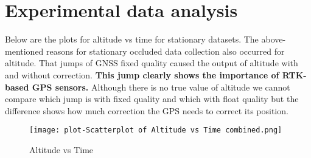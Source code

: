\documentclass[a4paper]{article}
\begin{document}
\section{Experimental data analysis}
Below are the plots for altitude vs time for stationary datasets. The above-mentioned reasons for stationary occluded data collection also occurred for altitude. That jumps of GNSS fixed quality caused the output of altitude with and without correction. \textbf{This jump clearly shows the importance of RTK-based GPS sensors.} Although there is no true value of altitude we cannot compare which jump is with fixed quality and which with float quality but the difference shows how much correction the GPS needs to correct its position.
\begin{figure}[h]
    \centering
    \texttt{[image: plot-Scatterplot of Altitude vs Time combined.png]}
    \caption{Altitude vs Time}
    \label{fig: Altitude vs Time}
\end{figure}
\end{document}

